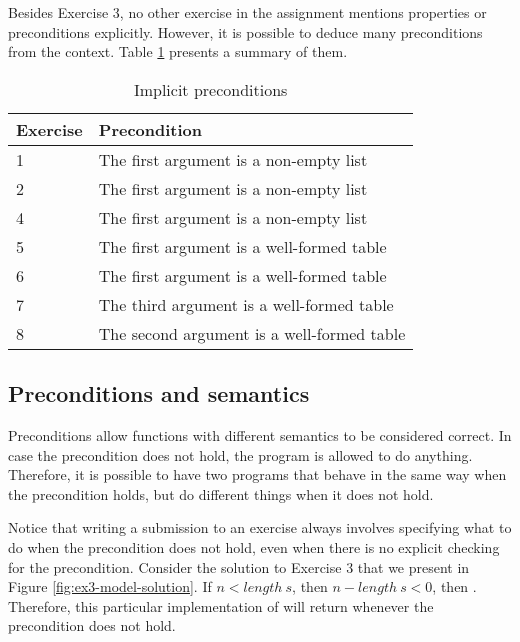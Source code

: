 Besides Exercise 3, no other exercise in the assignment mentions properties or preconditions explicitly. However, it is possible to deduce many preconditions from the context. Table \ref{tb:preconditions-implicit} presents a summary of them.

\begin{table}
\centering
\begin{tabular}{ m{5em} | m{20em} }
Exercise & Precondition \\
\hline
1 & The first argument is a non-empty list \\
\hline
2 & The first argument is a non-empty list \\
\hline
4 & The first argument is a non-empty list \\
\hline
5 & The first argument is a well-formed table \\
\hline
6 & The first argument is a well-formed table \\
\hline
7 & The third argument is a well-formed table \\
\hline
8 & The second argument is a well-formed table
\end{tabular}
\caption{Implicit preconditions}
\label{tb:preconditions-implicit}
\end{table}

\subsection{Preconditions and semantics}
\label{sec:preconditions-and-semantics}

Preconditions allow functions with different semantics to be considered correct. In case the precondition does not hold, the program is allowed to do anything. Therefore, it is possible to have two programs that behave in the same way when the precondition holds, but do different things when it does not hold.

Notice that writing a submission to an exercise always involves specifying what to do when the precondition does not hold, even when there is no explicit checking for the precondition. Consider the solution to Exercise 3 that we present in Figure \ref{fig:ex3-model-solution}. If $n < length\ s$, then $n - length\ s < 0$, then . Therefore, this particular implementation of  will return  whenever the precondition does not hold.



